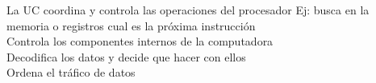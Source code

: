 \documentclass[preview]{standalone}
\begin{document}
La UC coordina y controla las operaciones del procesador                            Ej: busca en la memoria o registros cual es la próxima instrucción\\Controla los componentes internos de la computadora\\Decodifica los datos y decide que hacer con ellos\\Ordena el tráfico de datos\\
\end{document}
